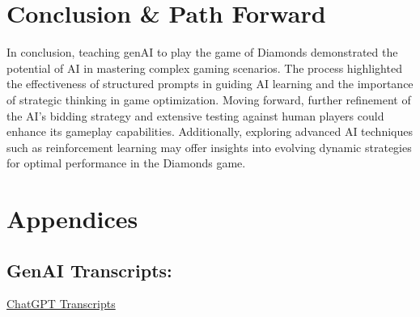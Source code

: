 \documentclass{article}
\begin{document}
\section*{Conclusion \& Path Forward}
In conclusion, teaching genAI to play the game of Diamonds demonstrated the potential of AI in mastering complex gaming scenarios. The process highlighted the effectiveness of structured prompts in guiding AI learning and the importance of strategic thinking in game optimization. Moving forward, further refinement of the AI's bidding strategy and extensive testing against human players could enhance its gameplay capabilities. Additionally, exploring advanced AI techniques such as reinforcement learning may offer insights into evolving dynamic strategies for optimal performance in the Diamonds game.

\section*{Appendices}
\subsection*{GenAI Transcripts:}
\href{https://chat.openai.com/share/81d09e24-8f1e-445f-86be-6a3ccc7f3704}{ChatGPT Transcripts}
\end{document}
